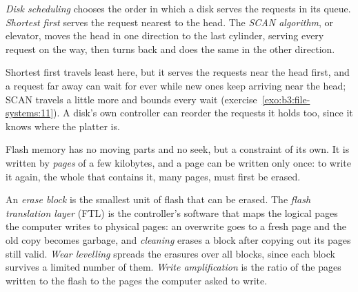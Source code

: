 \begin{definition}\label{def:b3:file-systems:disk-scheduling}
\emph{Disk scheduling} chooses the order in which a disk serves the requests in its queue. \emph{Shortest  first} serves the request nearest to the head. The \emph{SCAN algorithm}, or elevator, moves the head in one direction to the last cylinder, serving every request on the way, then turns back and does the same in the other direction.
\end{definition}

\label{lst:b3:file-systems:sched}

\label{out:b3:file-systems:sched}

Shortest  first travels least here, but it serves the requests near the head first, and a request far away can wait for ever while new ones keep arriving near the head; SCAN travels a little more and bounds every wait (exercise~\ref{exo:b3:file-systems:11}). A disk's own controller can reorder the requests it holds too, since it knows where the platter is.

Flash memory has no moving parts and no seek, but a constraint of its own. It is written by \emph{pages} of a few kilobytes, and a page can be written only once: to write it again, the whole \emph{} that contains it, many pages, must first be erased.

\begin{definition}\label{def:b3:file-systems:flash}
An \emph{erase block} is the smallest unit of flash that can be erased. The \emph{flash translation layer} (FTL) is the controller's software that maps the logical pages the computer writes to physical pages: an overwrite goes to a fresh page and the old copy becomes garbage, and \emph{cleaning} erases a block after copying out its pages still valid. \emph{Wear levelling} spreads the erasures over all blocks, since each block survives a limited number of them. \emph{Write amplification} is the ratio of the pages written to the flash to the pages the computer asked to write.
\end{definition}

